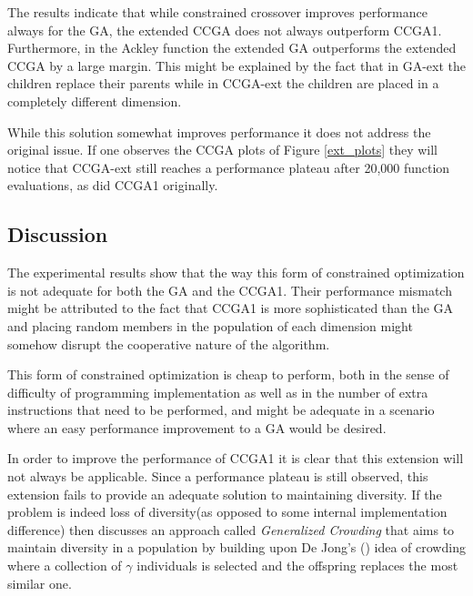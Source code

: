 \documentclass[12pt,a4paper,onecolumn]{article}
\begin{document}
The results indicate that while constrained crossover improves performance always for the GA, the extended CCGA does not always outperform CCGA1. Furthermore, in the Ackley function the extended GA outperforms the extended CCGA by a large margin. This might be explained by the fact that in GA-ext the children replace their parents while in CCGA-ext the children are placed in a completely different dimension.

While this solution somewhat improves performance it does not address the original issue. If one observes the CCGA plots of Figure \ref{ext_plots} they will notice that CCGA-ext still reaches a performance plateau after 20,000 function evaluations, as did CCGA1 originally.

\subsection{Discussion}
The experimental results show that the way this form of constrained optimization is not adequate for both the GA and the CCGA1. Their performance mismatch might be attributed to the fact that CCGA1 is more sophisticated than the GA and placing random members in the population of each dimension might somehow disrupt the cooperative nature of the algorithm.

This form of constrained optimization is cheap to perform, both in the sense of difficulty of programming implementation as well as in the number of extra instructions that need to be performed, and might be adequate in a scenario where an easy performance improvement to a GA would be desired.

In order to improve the performance of CCGA1 it is clear that this extension will not always be applicable. Since a performance plateau is still observed, this extension fails to provide an adequate solution to maintaining diversity. If the problem is indeed loss of diversity(as opposed to some internal implementation difference) then \cite{FODAVA} discusses an approach called \emph{Generalized Crowding} that aims to maintain diversity in a population by building upon De Jong's (\cite{FODAVA}) idea of crowding where a collection of $\gamma$ individuals is selected and the offspring replaces the most similar one.



\end{document}
